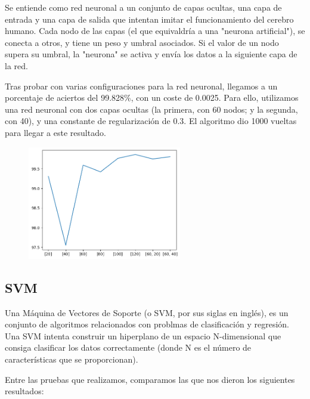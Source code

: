 \documentclass[11pt]{article}
\begin{document}
Se entiende como red neuronal a un conjunto de capas ocultas, una capa de entrada y una capa de salida que intentan imitar el funcionamiento del cerebro humano. Cada nodo de las capas (el que equivaldría a una "neurona artificial"), se conecta a otros, y tiene un peso y umbral asociados. Si el valor de un nodo supera su umbral, la "neurona" se activa y envía los datos a la siguiente capa de la red. 

Tras probar con varias configuraciones para la red neuronal, llegamos a un porcentaje de aciertos del 99.828\%, con un coste de 0.0025. Para ello, utilizamos una red neuronal con dos capas ocultas (la primera, con 60 nodos; y la segunda, con 40), y una constante de regularización de 0.3. El algoritmo dio 1000 vueltas para llegar a este resultado.

 \begin{figure}[H]
    \begin{center}
    \includegraphics[width=0.6\textwidth]{Results/NeuronalNetwork/NN.png}
    \end{center}
 \end{figure}

\subsection{SVM}

Una Máquina de Vectores de Soporte (o SVM, por sus siglas en inglés), es un conjunto de algoritmos relacionados con problmas de clasificación y regresión. Una SVM intenta construir un hiperplano de un espacio N-dimensional que consiga clasificar los datos correctamente (donde N es el número de características que se proporcionan).

Entre las pruebas que realizamos, comparamos las que nos dieron los siguientes resultados:
\end{document}

